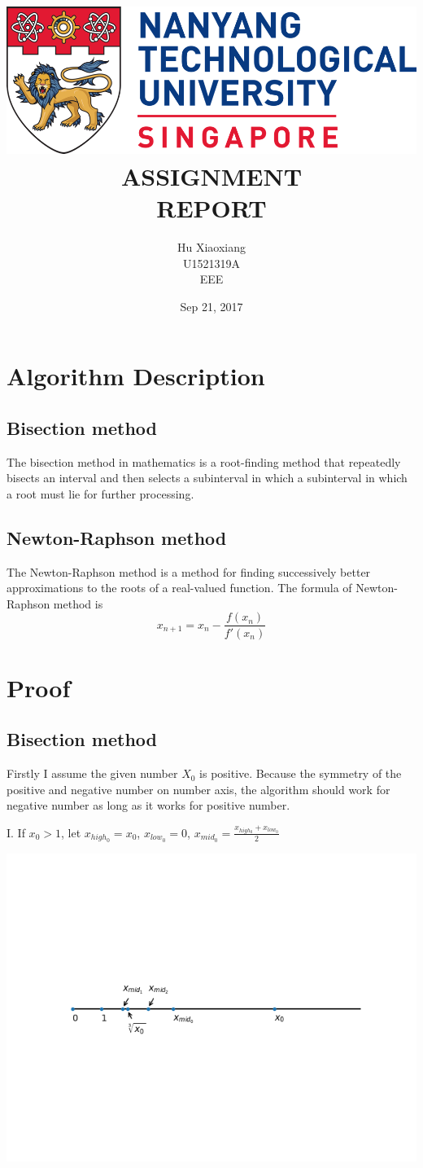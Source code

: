 \documentclass[a4paper]{scrartcl}
\author{Hu Xiaoxiang \\
U1521319A \\
EEE \\
}
\date{Sep 21, 2017 \\
}
\title{\includegraphics[width=\textwidth]{logo_ntu_new.png} \\
[3\baselineskip] ASSIGNMENT \\
REPORT \\
[7\baselineskip]}
\begin{document}
\maketitle
\tableofcontents

\newpage
\section{Algorithm Description}
\label{sec:org74dd27f}
\subsection{Bisection method}
\label{sec:org4a0bc4b}
The bisection method in mathematics is a root-finding method that repeatedly
bisects an interval and then selects a subinterval in which a subinterval
in which a root must lie for further processing.
\subsection{Newton-Raphson method}
\label{sec:orgf99cf3b}
The Newton-Raphson method is a method for finding successively better
approximations to the roots of a real-valued function. The formula of
Newton-Raphson method is $$x_{n+1} = x_n - \frac{f(x_n)}{f'(x_n)}$$

\section{Proof}
\label{sec:orgd1faf02}
\subsection{Bisection method}
\label{sec:org02a362d}
Firstly I assume the given number \(X_0\) is positive. Because the symmetry of
the positive and negative number on number axis, the algorithm should work
for negative number as long as it works for positive number.

I. If \(x_0 > 1\), let \(x_{high_0} = x_0\), \(x_{low_0} = 0\), \(x_{mid_0} = \frac{x_{high_0} + x_{low_0}}{2}\)
\begin{center}
\includegraphics[width=.9\linewidth]{numberAxis1.png}
\end{center}
\end{document}
